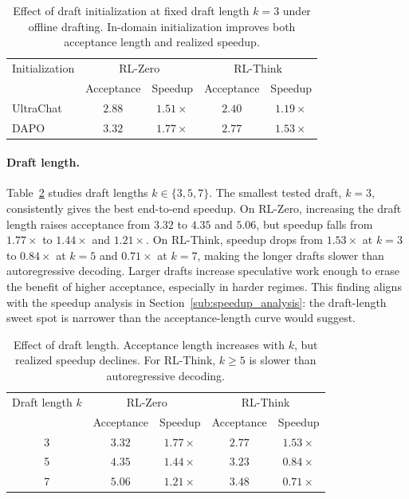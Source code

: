 \documentclass[11pt, logo, onecolumn, copyright, colorlinks=true, allcolors=blue]{nvidiatechreport}
\begin{document}
\begin{table}[ht]
  \centering
  \small
  \begin{tabular}{l cccc}
  \toprule
  \multicolumn{1}{c}{Initialization} & \multicolumn{2}{c}{RL-Zero} & \multicolumn{2}{c}{RL-Think} \\
  & Acceptance & Speedup & Acceptance & Speedup \\\midrule
  UltraChat & $2.88$ & $1.51\times$ & $2.40$ & $1.19\times$ \\
  DAPO & $3.32$ & $1.77\times$ & $2.77$ & $1.53\times$ \\
  \bottomrule
  \end{tabular}
  \caption{Effect of draft initialization at fixed draft length $k=3$ under offline drafting. In-domain initialization improves both acceptance length and realized speedup.}
  \label{tab:init_ablation}
\end{table}

\paragraph{Draft length.}
Table~\ref{tab:length_ablation} studies draft lengths $k \in \{3,5,7\}$. The smallest tested draft, $k=3$, consistently gives the best end-to-end speedup. On RL-Zero, increasing the draft length raises acceptance from $3.32$ to $4.35$ and $5.06$, but speedup falls from $1.77\times$ to $1.44\times$ and $1.21\times$. On RL-Think, speedup drops from $1.53\times$ at $k=3$ to $0.84\times$ at $k=5$ and $0.71\times$ at $k=7$, making the longer drafts slower than autoregressive decoding. Larger drafts increase speculative work enough to erase the benefit of higher acceptance, especially in harder regimes. This finding aligns with the speedup analysis in Section~\ref{sub:speedup_analysis}: the draft-length sweet spot is narrower than the acceptance-length curve would suggest.

\begin{table}[ht]
\centering
\small
\begin{tabular}{c cccc}
\toprule
\multicolumn{1}{c}{Draft length $k$} & \multicolumn{2}{c}{RL-Zero} & \multicolumn{2}{c}{RL-Think} \\
 & Acceptance & Speedup & Acceptance & Speedup \\
\midrule
3 & $3.32$ & $1.77\times$ & $2.77$ & $1.53\times$ \\
5 & $4.35$ & $1.44\times$ & $3.23$ & $0.84\times$ \\
7 & $5.06$ & $1.21\times$ & $3.48$ & $0.71\times$ \\
\bottomrule
\end{tabular}
\caption{Effect of draft length. Acceptance length increases with $k$, but realized speedup declines. For RL-Think, $k \geq 5$ is slower than autoregressive decoding.}
\label{tab:length_ablation}
\end{table}
\end{document}
